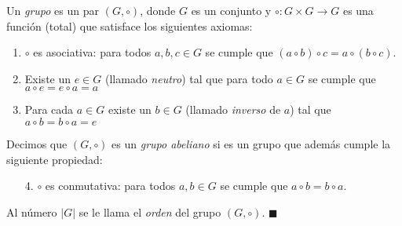 

\begin{definition}
Un \emph{grupo} es un par $(G,\circ)$, donde $G$ es un conjunto y $\circ \colon G\times G\to G$ es una función (total) que satisface los siguientes axiomas:
\begin{enumerate}
	\item $\circ$ es asociativa: para todos $a,b,c \in G$ se cumple que $(a \circ b) \circ c = a \circ (b
\circ c)$.

	\item Existe un $e \in G$ (llamado \emph{neutro}) tal que para todo $a \in G$ se cumple que $a \circ e = e \circ a = a$

   \item Para cada $a \in G$ existe un $b \in G$ (llamado \emph{inverso} de $a$) tal que $a \circ b 	= b \circ a = e$
\end{enumerate}
Decimos que $(G,\circ)$ es un \emph{grupo abeliano} si es un grupo que además cumple la siguiente propiedad:
\begin{enumerate}
	\item[4.] $\circ$ es conmutativa: para todos $a,b\in G$ se cumple que $a\circ b = b\circ a$. 
\end{enumerate}
Al número $|G|$ se le llama el \emph{orden} del grupo $(G, \circ)$. \hfill$\blacksquare$
\end{definition}

